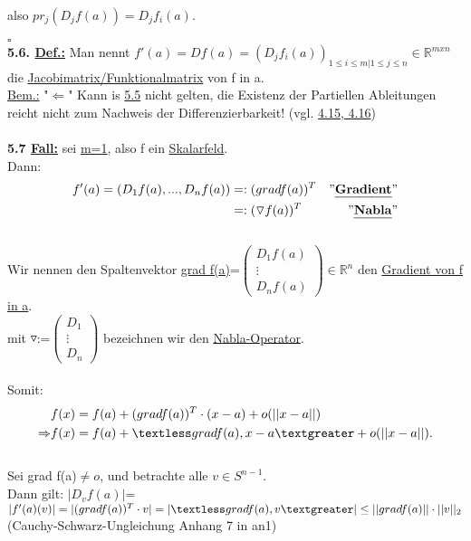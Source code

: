 \documentclass[]{scrartcl}
\begin{document}
	also $pr_j(D_jf(a))=D_jf_i(a)$.\\
	\strut\hfill$\square$\\
	\textbf{5.6. \underline{Def.:}} Man nennt $f'(a)=Df(a)=(D_jf_i(a))_{1\leq 
	i\leq m|1\leq j\leq n}\in\mathbb{R}^{m x n}$\\
	die \ul{Jacobimatrix/Funktionalmatrix} von f in a.\\
	\underline{Bem.:} "$\Leftarrow$" Kann is \ul{5.5} nicht gelten, die Existenz der Partiellen Ableitungen reicht nicht zum Nachweis der Differenzierbarkeit! (vgl. \ul{4.15, 4.16})\\
	\\
	\textbf{5.7 \underline{Fall:}} sei \underline{\underline{m=1}}, also f ein \underline{Skalarfeld}.\\
	Dann: \begin{align}
		f'(a)=(D_1f(a),...,D_nf(a))&=:(grad f(a))^T &"\ul{\textbf{Gradient}}"\\
		&=:(\triangledown f(a))^T &"\ul{\textbf{Nabla}}"
	\end{align}\\
	Wir nennen den Spaltenvektor  \ul{grad f(a)}=$\begin{pmatrix}
		D_1f(a)\\\vdots\\D_nf(a)
	\end{pmatrix} \in \mathbb{R}^n$ den \ul{Gradient von f in a}.\\
	 mit \ul{$\triangledown$}:=$\begin{pmatrix}
		D_1\\\vdots\\D_n
	\end{pmatrix}$ bezeichnen wir den \ul{Nabla-Operator}.\\
	\\
	Somit:\begin{align}
		&f(x)=f(a)+(grad f(a))^T\cdot(x-a)+o(||x-a||)\\
		\Rightarrow &f(x)=f(a)+\textless grad f(a), x-a\textgreater + o(||x-a||).
	\end{align}\\
	Sei grad f(a)$\neq o$, und betrachte alle $v\in S^{n-1}$.\\
	Dann gilt: \ul{$|D_vf(a)|$}=$|f'(a)(v)|=|(grad f(a))^T\cdot v|\\
	=|\textless grad f(a),v\textgreater|\leq ||grad f(a)||\cdot ||v||_2$ 
	(Cauchy-Schwarz-Ungleichung Anhang 7 in an1)\\
\end{document}
